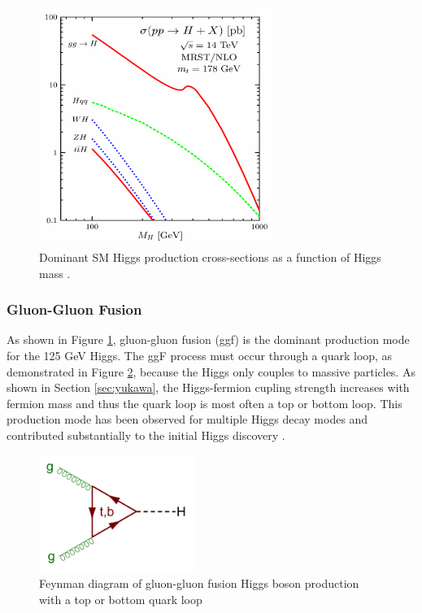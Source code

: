 \begin{figure}[h]
    \centering
    \includegraphics[width=3in]{figures/chapter1/higgs_prod.png}
    \caption{Dominant SM Higgs production cross-sections as a function of Higgs mass \cite{higgs_prod_fig}.}
    \label{fig:higgs_prod}
\end{figure}

\subsubsection{Gluon-Gluon Fusion}\label{sec:ggf}
As shown in Figure \ref{fig:higgs_prod}, gluon-gluon fusion (ggf) is the dominant production mode for the 125 GeV Higgs. The ggF process must occur through a quark loop, as demonstrated in Figure \ref{fig:ggf}, because the Higgs only couples to massive particles. As shown in Section \ref{sec:yukawa}, the Higgs-fermion cupling strength increases with fermion mass and thus the quark loop is most often a top or bottom loop. This production mode has been observed for multiple Higgs decay modes and contributed substantially to the initial Higgs discovery \cite{higgs_disc_atlas}.

\begin{figure}[h]
    \centering
    \includegraphics[width=2in]{figures/chapter1/ggf.png}
    \caption{Feynman diagram of gluon-gluon fusion Higgs boson production with a top or bottom quark loop}
    \label{fig:ggf}
\end{figure}

